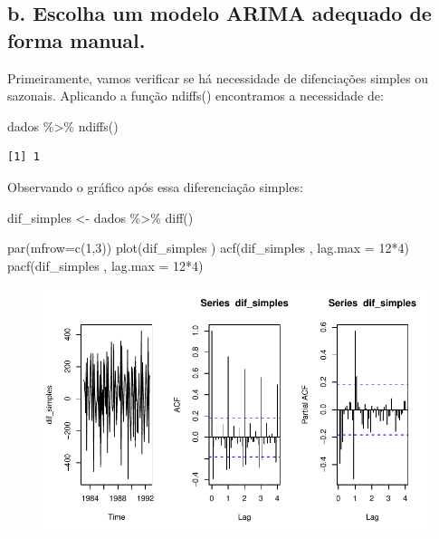 \documentclass[
  letterpaper,
  DIV=11,
  numbers=noendperiod]{scrartcl}
\newenvironment{Shaded}{\begin{snugshade}}{\end{snugshade}}
\newcommand{\AttributeTok}[1]{\textcolor[rgb]{0.40,0.45,0.13}{#1}}
\newcommand{\DecValTok}[1]{\textcolor[rgb]{0.68,0.00,0.00}{#1}}
\newcommand{\FunctionTok}[1]{\textcolor[rgb]{0.28,0.35,0.67}{#1}}
\newcommand{\NormalTok}[1]{\textcolor[rgb]{0.00,0.23,0.31}{#1}}
\newcommand{\OtherTok}[1]{\textcolor[rgb]{0.00,0.23,0.31}{#1}}
\newcommand{\SpecialCharTok}[1]{\textcolor[rgb]{0.37,0.37,0.37}{#1}}
\begin{document}
\hypertarget{b.-escolha-um-modelo-arima-adequado-de-forma-manual.}{%
\subsection{b. Escolha um modelo ARIMA adequado de forma
manual.}\label{b.-escolha-um-modelo-arima-adequado-de-forma-manual.}}

Primeiramente, vamos verificar se há necessidade de difenciações simples
ou sazonais. Aplicando a função ndiffs() encontramos a necessidade de:

\begin{Shaded}
\begin{Highlighting}[]
\NormalTok{dados }\SpecialCharTok{\%\textgreater{}\%} \FunctionTok{ndiffs}\NormalTok{() }
\end{Highlighting}
\end{Shaded}

\begin{verbatim}
[1] 1
\end{verbatim}

Observando o gráfico após essa diferenciação simples:

\begin{Shaded}
\begin{Highlighting}[]
\NormalTok{dif\_simples }\OtherTok{\textless{}{-}}\NormalTok{ dados }\SpecialCharTok{\%\textgreater{}\%} \FunctionTok{diff}\NormalTok{() }

\FunctionTok{par}\NormalTok{(}\AttributeTok{mfrow=}\FunctionTok{c}\NormalTok{(}\DecValTok{1}\NormalTok{,}\DecValTok{3}\NormalTok{))}
\FunctionTok{plot}\NormalTok{(dif\_simples )}
\FunctionTok{acf}\NormalTok{(dif\_simples , }\AttributeTok{lag.max =} \DecValTok{12}\SpecialCharTok{*}\DecValTok{4}\NormalTok{)}
\FunctionTok{pacf}\NormalTok{(dif\_simples , }\AttributeTok{lag.max =} \DecValTok{12}\SpecialCharTok{*}\DecValTok{4}\NormalTok{)}
\end{Highlighting}
\end{Shaded}

\begin{figure}[H]

{\centering \includegraphics{Trabalhao1_ST_grupo5_2023_05_16_files/figure-pdf/unnamed-chunk-7-1.pdf}

}

\end{figure}
\end{document}

